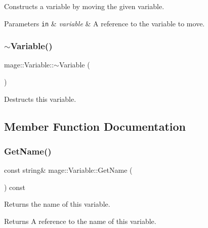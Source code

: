 Constructs a variable by moving the given variable.


\begin{DoxyParams}[1]{Parameters}
\mbox{\tt in}  & {\em variable} & A reference to the variable to move. \\
\hline
\end{DoxyParams}
\hypertarget{structmage_1_1_variable_a7503f010f296683cecf9be65a3f86589}{}\label{structmage_1_1_variable_a7503f010f296683cecf9be65a3f86589} 
\subsubsection{\texorpdfstring{$\sim$\+Variable()}{~Variable()}}
{\footnotesize\ttfamily mage\+::\+Variable\+::$\sim$\+Variable (\begin{DoxyParamCaption}{ }\end{DoxyParamCaption})\hspace{0.3cm}{\ttfamily [default]}}

Destructs this variable. 

\subsection{Member Function Documentation}
\hypertarget{structmage_1_1_variable_a23003aa97e07342b201068a041571d77}{}\label{structmage_1_1_variable_a23003aa97e07342b201068a041571d77} 
\subsubsection{\texorpdfstring{Get\+Name()}{GetName()}}
{\footnotesize\ttfamily const string\& mage\+::\+Variable\+::\+Get\+Name (\begin{DoxyParamCaption}{ }\end{DoxyParamCaption}) const\hspace{0.3cm}{\ttfamily [noexcept]}}

Returns the name of this variable.

\begin{DoxyReturn}{Returns}
A reference to the name of this variable. 
\end{DoxyReturn}
\hypertarget{structmage_1_1_variable_a7a08695051144936e1bdf1c762c148d7}{}\label{structmage_1_1_variable_a7a08695051144936e1bdf1c762c148d7} 
